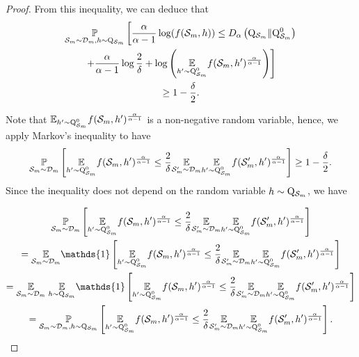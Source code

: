 \begin{noaddcontents}
\begin{proof}
From this inequality, we can deduce that
\begin{multline}
  \label{eq: viallard_dis_eq11}
  \underset{\mathcal{S}_m \sim \mathcal{D}_{m}, h \sim \mathrm{Q}_{\mathcal{S}_m}}{\mathbb{P}}\left[\frac{\alpha}{\alpha-1} \log (f(\mathcal{S}_m,h)) \leq D_{\alpha}\left(\mathrm{Q}_{\mathcal{S}_m} \| \mathrm{Q}_{\mathcal{S}_m}^0\right) \right.\\
  \left.+\frac{\alpha}{\alpha-1} \log \frac{2}{\delta}+\log \left(\underset{h^{\prime} \sim \mathrm{Q}_{\mathcal{S}_m}^0}{\mathbb{E}} f(\mathcal{S}_m,h')^{\frac{\alpha}{\alpha-1}}\right)\right] \\
  \geq 1-\frac{\delta}{2} .
\end{multline}


Note that $\mathbb{E}_{h^{\prime} \sim \mathrm{Q}_{\mathcal{S}_m}^0} f(\mathcal{S}_m,h')^{\frac{\alpha}{\alpha-1}}$ is a non-negative random variable, hence, we apply Markov's inequality to have
$$
\underset{\mathcal{S}_m \sim \mathcal{D}_{m}}{\mathbb{P}}\left[\underset{h^{\prime} \sim \mathrm{Q}_{\mathcal{S}_m}^0}{\mathbb{E}} f(\mathcal{S}_m,h')^{\frac{\alpha}{\alpha-1}} \leq \frac{2}{\delta} \underset{\mathcal{S}_m^{\prime} \sim \mathcal{D}_{m}}{\mathbb{E}} \underset{h^{\prime} \sim \mathrm{Q}_{\mathcal{S}_m}^0}{\mathbb{E}} f(\mathcal{S}_m',h')^{\frac{\alpha}{\alpha-1}}\right] \geq 1-\frac{\delta}{2} .
$$
Since the inequality does not depend on the random variable $h \sim \mathrm{Q}_{\mathcal{S}_m}$, we have

\begin{multline*}
\underset{\Sm \sim \Dm}{\mathbb{P}}\left[\underset{h^{\prime} \sim \Q_{\Sm}^0}{\mathbb{E}} f(\Sm,h')^{\frac{\alpha}{\alpha-1}} \leq \frac{2}{\delta} \underset{\Sm^{\prime} \sim \Dm}{\mathbb{E}} \underset{h^{\prime} \sim \Q_{\Sm}^0}{\mathbb{E}} f(\Sm',h')^{\frac{\alpha}{\alpha-1}}\right] \\
=\underset{\Sm \sim \Dm}{\mathbb{E}}\mathds{1}\left[\underset{h'\sim \Q_{\Sm}^0}{\mathbb{E}} f(\Sm,h')^{\frac{\alpha}{\alpha-1}} \leq \frac{2}{\delta} \underset{\Sm^{\prime} \sim \Dm}{\mathbb{E}} \underset{h^{\prime} \sim \Q_{\Sm}^0}{\mathbb{E}} f(\Sm',h')^{\frac{\alpha}{\alpha-1}}\right] \\
=\underset{\Sm \sim \Dm}{\mathbb{E}}\; \underset{h \sim \Q_{\Sm}}{\mathbb{E}} \mathds{1}\left[\underset{h^{\prime} \sim \Q_{\Sm}^0}{\mathbb{E}} f(\Sm,h')^{\frac{\alpha}{\alpha-1}} \leq \frac{2}{\delta} \underset{\Sm^{\prime} \sim \Dm}{\mathbb{E}} \underset{h^{\prime} \sim \Q_{\Sm}^0}{\mathbb{E}} f(\Sm',h')^{\frac{\alpha}{\alpha-1}}\right] \\
=\underset{\Sm \sim \Dm, h \sim \Q_{\Sm}}{\mathbb{P}}\left[\underset{h^{\prime} \sim \Q_{\Sm}^0}{\mathbb{E}} f(\Sm,h')^{\frac{\alpha}{\alpha-1}} \leq \frac{2}{\delta} \underset{\Sm^{\prime} \sim \Dm}{\mathbb{E}} \underset{h^{\prime} \sim \Q_{\Sm}^0}{\mathbb{E}} f(\Sm',h')^{\frac{\alpha}{\alpha-1}}\right] .
\end{multline*}


\end{proof}
\end{noaddcontents}
